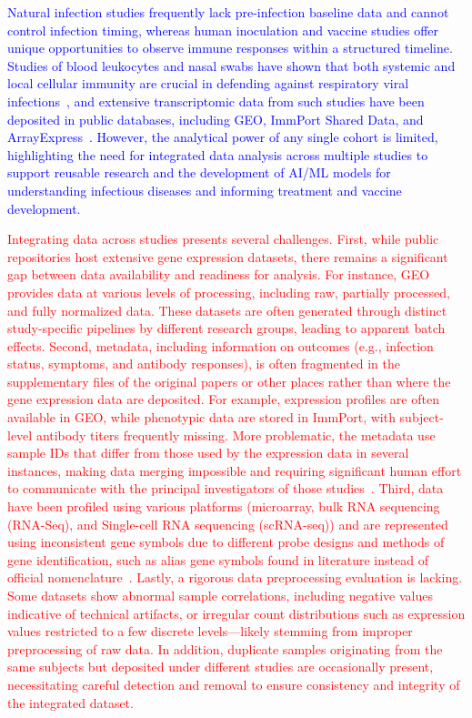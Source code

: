 \documentclass[
  12pt]{article}
\newcommand{\delmark}[1]{\textcolor{red}{#1}}
\newcommand{\addmark}[1]{\textcolor{blue}{#1}}
\begin{document}
\medskip
\addmark{Natural infection studies frequently lack pre-infection baseline data and cannot control infection timing, whereas human inoculation and vaccine studies offer unique opportunities to observe immune responses within a structured timeline. Studies of blood leukocytes and nasal swabs have shown that both systemic and local cellular immunity are crucial in defending against respiratory viral infections~\citep{liu2016individualized,zaas2009gene,huang2011temporal,davenport2015transcriptomic,rosenheim2023sars,proud2008gene,muller2017development,habibi2020neutrophilic}, and extensive transcriptomic data from such studies have been deposited in public databases, including GEO, ImmPort Shared Data, and ArrayExpress~\citep{barrett2012ncbi,bhattacharya2018immport,parkinson2007arrayexpress}. However, the analytical power of any single cohort is limited, highlighting the need for integrated data analysis across multiple studies to support reusable research and the development of AI/ML models for understanding infectious diseases and informing treatment and vaccine development.}

\medskip
\delmark{Integrating data across studies presents several challenges. First, while public repositories host extensive gene expression datasets, there remains a significant gap between data availability and readiness for analysis. For instance, GEO provides data at various levels of processing, including raw, partially processed, and fully normalized data. These datasets are often generated through distinct study-specific pipelines by different research groups, leading to apparent batch effects. Second, metadata, including information on outcomes (e.g., infection status, symptoms, and antibody responses), is often fragmented in the supplementary files of the original papers or other places rather than where the gene expression data are deposited. For example, expression profiles are often available in GEO, while phenotypic data are stored in ImmPort, with subject-level antibody titers frequently missing. More problematic, the metadata use sample IDs that differ from those used by the expression data in several instances, making data merging impossible and requiring significant human effort to communicate with the principal investigators of those studies~\citep{grewe2024mva,lee2022prior,furman2017expression}.  Third, data have been profiled using various platforms (microarray, bulk RNA sequencing (RNA-Seq), and Single-cell RNA sequencing (scRNA-seq)) and are represented using inconsistent gene symbols due to different probe designs and methods of gene identification, such as alias gene symbols found in literature instead of official nomenclature~\citep{ziemann2016gene}. Lastly, a rigorous data preprocessing evaluation is lacking. Some datasets show abnormal sample correlations, including negative values indicative of technical artifacts, or irregular count distributions such as expression values restricted to a few discrete levels—likely stemming from improper preprocessing of raw data. In addition, duplicate samples originating from the same subjects but deposited under different studies are occasionally present, necessitating careful detection and removal to ensure consistency and integrity of the integrated dataset.}
\end{document}
